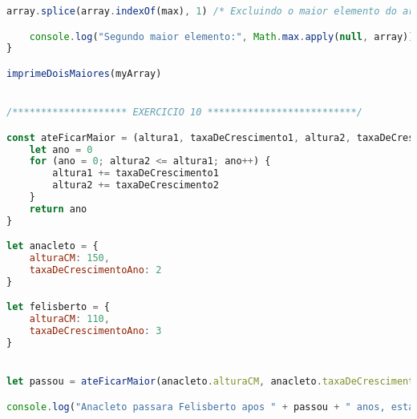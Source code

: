 \documentclass{scrreprt}
\begin{document}
\begin{lstlisting}[language=JavaScript]
	array.splice(array.indexOf(max), 1) /* Excluindo o maior elemento do array */ 

	console.log("Segundo maior elemento:", Math.max.apply(null, array)) /* Encontrando e imprimindo o proximo maior */ 
}

imprimeDoisMaiores(myArray)


/******************** EXERCICIO 10 **************************/

const ateFicarMaior = (altura1, taxaDeCrescimento1, altura2, taxaDeCrescimento2) => {
	let ano = 0
	for (ano = 0; altura2 <= altura1; ano++) {
		altura1 += taxaDeCrescimento1
		altura2 += taxaDeCrescimento2
	}
	return ano
}

let anacleto = {
	alturaCM: 150,
	taxaDeCrescimentoAno: 2 
}

let felisberto = {
	alturaCM: 110,
	taxaDeCrescimentoAno: 3 
}


let passou = ateFicarMaior(anacleto.alturaCM, anacleto.taxaDeCrescimentoAno, felisberto.alturaCM, felisberto.taxaDeCrescimentoAno)

console.log("Anacleto passara Felisberto apos " + passou + " anos, estando com 2m33cm e seu irmao com 2m32cm!")
\end{lstlisting}
\end{document}
